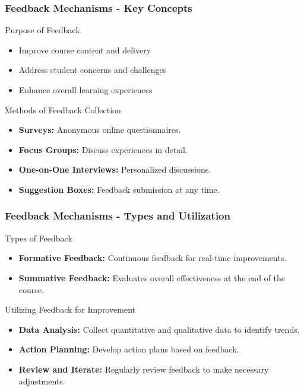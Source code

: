 \documentclass[aspectratio=169]{beamer}
\begin{document}
\begin{frame}[fragile]
    \frametitle{Feedback Mechanisms - Key Concepts}
    \begin{block}{Purpose of Feedback}
        \begin{itemize}
            \item Improve course content and delivery
            \item Address student concerns and challenges
            \item Enhance overall learning experiences
        \end{itemize}
    \end{block}

    \begin{block}{Methods of Feedback Collection}
        \begin{itemize}
            \item \textbf{Surveys:} Anonymous online questionnaires.
            \item \textbf{Focus Groups:} Discuss experiences in detail.
            \item \textbf{One-on-One Interviews:} Personalized discussions.
            \item \textbf{Suggestion Boxes:} Feedback submission at any time.
        \end{itemize}
    \end{block}
\end{frame}

\begin{frame}[fragile]
    \frametitle{Feedback Mechanisms - Types and Utilization}
    \begin{block}{Types of Feedback}
        \begin{itemize}
            \item \textbf{Formative Feedback:} Continuous feedback for real-time improvements.
            \item \textbf{Summative Feedback:} Evaluates overall effectiveness at the end of the course.
        \end{itemize}
    \end{block}

    \begin{block}{Utilizing Feedback for Improvement}
        \begin{itemize}
            \item \textbf{Data Analysis:} Collect quantitative and qualitative data to identify trends.
            \item \textbf{Action Planning:} Develop action plans based on feedback.
            \item \textbf{Review and Iterate:} Regularly review feedback to make necessary adjustments.
        \end{itemize}
    \end{block}
\end{frame}
\end{document}
